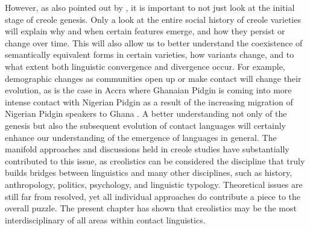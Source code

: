 \documentclass[output=paper,
modfonts
]{langscibook}
\begin{document}
However, as also pointed out by \cite{baptista2015continuum, baptista2017competition}, it is important to not just look at the initial stage of creole genesis. Only a look at the entire social history of creole varieties will explain why and when certain features emerge, and how they persist or change over time. This will also allow us to better understand the coexistence of semantically equivalent forms in certain varieties, how variants change, and to what extent both linguistic convergence and divergence occur. For example, demographic changes as communities open up or make contact will change their evolution, as is the case in Accra where Ghanaian Pidgin is coming into more intense contact with Nigerian Pidgin as a result of the increasing migration of Nigerian Pidgin speakers to Ghana \citep{bonnieetal2019multilingualism}. A better understanding not only of the genesis but also the subsequent evolution of contact languages will certainly enhance our understanding of the emergence of languages in general. The manifold approaches and discussions held in creole studies have substantially contributed to this issue, as creolistics can be considered the discipline that truly builds bridges between linguistics and many other disciplines, such as history, anthropology, politics, psychology, and linguistic typology. Theoretical issues are still far from resolved, yet all individual approaches do contribute a piece to the overall puzzle. The present chapter has shown that creolistics may be the most interdisciplinary of all areas within contact linguistics.





\printbibliography[heading=subbibliography,notkeyword=this]
\end{document}
